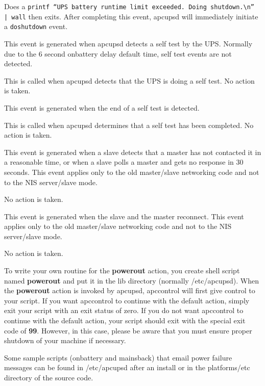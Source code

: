 {{{{{{{{{\begin{description}
Does a {\tt printf ``UPS battery runtime limit exceeded. Doing
shutdown.\textbackslash{}n'' | wall} then exits. After completing this event,
apcupsd will immediately initiate a {\tt doshutdown} event.  

\item [startselftest]
   This event is generated when apcupsd detects a self test by the UPS. Normally
due to the 6 second onbattery delay default time, self test events are not
detected.  

This is called when apcupsd detects that the UPS is doing a self test. No
action is taken.  

\item [endselftest]
   This event is generated when the end of a self test is detected.  

This is called when apcupsd determines that a self test has been completed. No
action is taken.  

\item [mastertimeout]
   This event is generated when a slave detects that a master has not contacted
it in a reasonable time, or when a slave polls a master and gets no response
in 30 seconds. This event applies only to the old master/slave networking code
and not to the NIS server/slave mode.  

No action is taken.  

\item [masterconnect]
   This event is generated when the slave and the master reconnect. This event
applies only to the old master/slave networking code and not to the NIS
server/slave mode.  

No action is taken. 
\end{description}

To write your own routine for the {\bf powerout} action, you create shell
script named {\bf powerout} and put it in the lib directory (normally
/etc/apcupsd).  When the {\bf powerout} action is invoked by apcupsd,
apccontrol will first give control to your script.  If you want apccontrol to
continue with the default action, simply exit your script with an exit status
of zero.  If you do not want apccontrol to continue with the default action,
your script should exit with the special exit code of {\bf 99}.  However, in
this case, please be aware that you must ensure proper shutdown of your
machine if necessary.  

Some sample scripts (onbattery and mainsback) that email power failure
messages can be found in /etc/apcupsd after an install or in the
platforms/etc directory of the source code.

}}}}}}}}}
